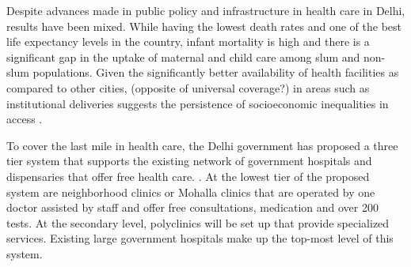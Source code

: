 Despite advances made in public policy and infrastructure in health care in Delhi, results have been mixed. While having the lowest death rates and one of the best life expectancy levels in the country, infant mortality is high and there is a significant gap in the uptake of maternal and child care among slum and non-slum populations. Given the significantly better availability of health facilities as compared to other cities, (opposite of universal coverage?) in areas such as institutional deliveries suggests the persistence of socioeconomic inequalities in access \cite{mazumdar2015health}.

To cover the last mile in health care, the Delhi government has proposed a three tier system that supports the existing network of government hospitals and dispensaries that offer free health care. \cite{article}. At the lowest tier of the proposed system are neighborhood clinics or Mohalla clinics that are operated by one doctor assisted by staff and offer free consultations, medication and over 200 tests. At the secondary level, polyclinics will be set up that provide specialized services. Existing large government hospitals make up the top-most level of this system.




